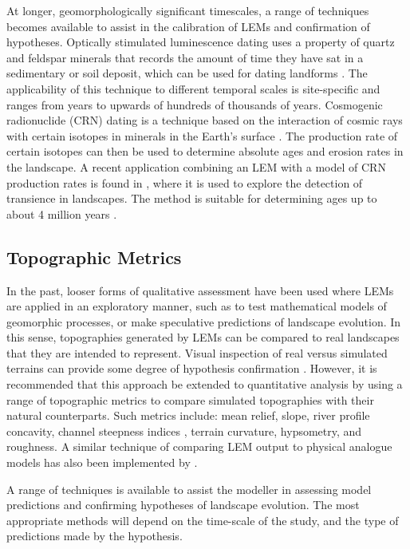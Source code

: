 At longer, geomorphologically significant timescales, a range of techniques becomes available to assist in the calibration of LEMs and confirmation of hypotheses. Optically stimulated luminescence dating uses a property of quartz and feldspar minerals that records the amount of time they have sat in a sedimentary or soil deposit, which can be used for dating landforms \citep{aitken1998introduction,Stokes1999a,Murray2000}. The applicability of this technique to different temporal scales is site-specific and ranges from years to upwards of hundreds of thousands of years. Cosmogenic radionuclide (CRN) dating is a technique based on the interaction of cosmic rays with certain isotopes in minerals in the Earth's surface \citep{Anderson1996,dunai2010cosmogenic}. The production rate of certain isotopes can then be used to determine absolute ages and erosion rates in the landscape. A recent application combining an LEM with a model of CRN production rates is found in \citet{mudd2017detection}, where it is used to explore the detection of transience in landscapes. The method is suitable for determining ages up to about 4 million years \citep{Burbank2011}.

\subsection{Topographic Metrics}
In the past, looser forms of qualitative assessment have been used where LEMs are applied in an exploratory manner, such as to test mathematical models of geomorphic processes, or make speculative predictions of landscape evolution. In this sense, topographies generated by LEMs can be compared to real landscapes that they are intended to represent. Visual inspection of real versus simulated terrains can provide some degree of hypothesis confirmation \citep{bras2003six,hooke2003predictive}. However, it is recommended that this approach be extended to quantitative analysis by using a range of topographic metrics to compare simulated topographies with their natural counterparts. Such metrics include: mean relief, slope, river profile concavity, channel steepness indices \citep[e.g.][]{wobus2006tectonics}, terrain curvature, hypsometry, and roughness. A similar technique of comparing LEM output to physical analogue models has also been implemented by \citet{hancock2002testing}. 

A range of techniques is available to assist the modeller in assessing model predictions and confirming hypotheses of landscape evolution. The most appropriate methods will depend on the time-scale of the study, and the type of predictions made by the hypothesis. 

